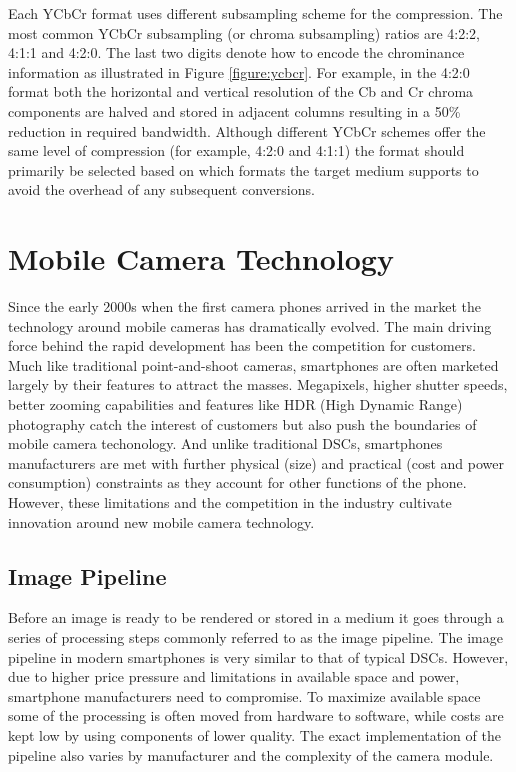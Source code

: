 \documentclass[thesis.tex]{subfiles}
\begin{document}
Each YCbCr format uses different subsampling scheme for the compression. The most common YCbCr subsampling (or chroma subsampling) ratios are 4:2:2, 4:1:1 and 4:2:0. The last two digits denote how to encode the chrominance information as illustrated in Figure \ref{figure:ycbcr}. For example, in the 4:2:0 format both the horizontal and vertical resolution of the Cb and Cr chroma components are halved and stored in adjacent columns resulting in a 50\% reduction in required bandwidth. Although different YCbCr schemes offer the same level of compression (for example, 4:2:0 and 4:1:1) the format should primarily be selected based on which formats the target medium supports to avoid the overhead of any subsequent conversions.

\section{Mobile Camera Technology}
Since the early 2000s when the first camera phones arrived in the market the technology around mobile cameras has dramatically evolved. The main driving force behind the rapid development has been the competition for customers. Much like traditional point-and-shoot cameras, smartphones are often marketed largely by their features to attract the masses. Megapixels, higher shutter speeds, better zooming capabilities and features like HDR (High Dynamic Range) photography catch the interest of customers but also push the boundaries of mobile camera techonology. And unlike traditional DSCs, smartphones manufacturers are met with further physical (size) and practical (cost and power consumption) constraints as they account for other functions of the phone. However, these limitations and the competition in the industry cultivate innovation around new mobile camera technology.

\subsection{Image Pipeline}
Before an image is ready to be rendered or stored in a medium it goes through a series of processing steps commonly referred to as the image pipeline. The image pipeline in modern smartphones is very similar to that of typical DSCs. However, due to higher price pressure and limitations in available space and power, smartphone manufacturers need to compromise. To maximize available space some of the processing is often moved from hardware to software, while costs are kept low by using components of lower quality. The exact implementation of the pipeline also varies by manufacturer and the complexity of the camera module.
\end{document}

